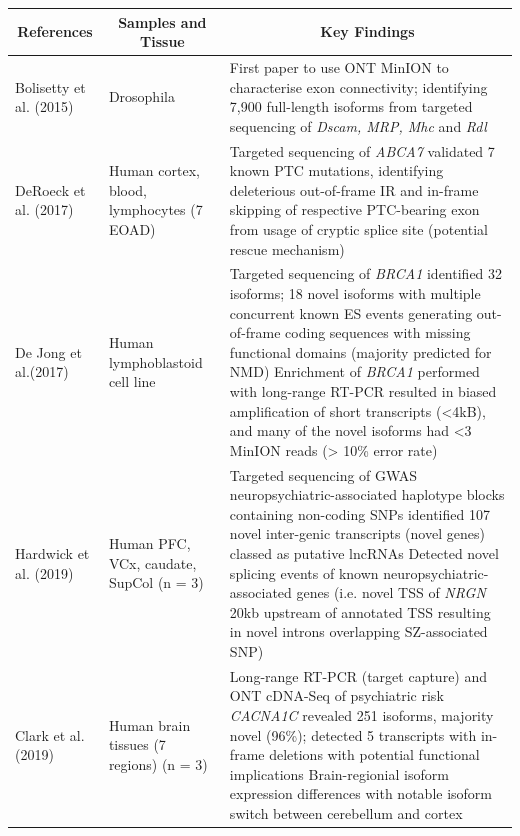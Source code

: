 \begin{changemargin}{1.5cm}
\begin{landscape}
\begin{longtable}[c]{p{4cm}p{4cm}p{18cm}}
			\toprule
			\multicolumn{1}{c}{References} &
			\multicolumn{1}{c}{Samples and Tissue} &
			\multicolumn{1}{c}{Key Findings} \\* \midrule
			\endfirsthead
			\endhead
			\bottomrule
			\endfoot
			\endlastfoot
			\centering Bolisetty et al. (2015)\cite{Bolisetty2015} &
			\centering Drosophila &
			\tabitem First paper to use ONT MinION to characterise exon connectivity; identifying 7,900 full-length isoforms from targeted sequencing of \textit{Dscam, MRP, Mhc} and \textit{Rdl}  \\
			\hdashline[0.5pt/5pt]
			
			\centering DeRoeck et al. (2017)\cite{DeRoeck2017}  &
			\centering Human cortex, blood, lymphocytes (7 EOAD) &
			\tabitem Targeted sequencing of \textit{ABCA7} validated 7 known PTC mutations, identifying deleterious out-of-frame IR and in-frame skipping of respective PTC-bearing exon from usage of cryptic splice site (potential rescue mechanism) \\
			\hdashline[0.5pt/5pt]
			
			\centering De Jong et al.(2017)\cite{DeJong2017}  &
			\centering Human lymphoblastoid cell line &
			\tabitem Targeted sequencing of \textit{BRCA1} identified 32 isoforms; 18 novel isoforms with multiple concurrent known ES events generating out-of-frame coding sequences with missing functional domains (majority predicted for NMD) \newline
			\tabitem Enrichment of \textit{BRCA1} performed with long-range RT-PCR resulted in biased amplification of short transcripts (<4kB), and many of the novel isoforms had <3 MinION reads (> 10\% error rate)  \\
			\hdashline[0.5pt/5pt]
			
			\centering Hardwick et al. (2019) \cite{Hardwick2019a} &
			\centering Human PFC, VCx, \newline caudate, SupCol (n = 3)  &
			\tabitem Targeted sequencing of GWAS neuropsychiatric-associated haplotype blocks containing non-coding SNPs identified 107 novel inter-genic transcripts (novel genes) classed as putative lncRNAs \newline 
			\tabitem Detected novel splicing events of known neuropsychiatric-associated genes (i.e. novel TSS of \textit{NRGN} 20kb upstream of annotated TSS resulting in novel introns overlapping SZ-associated SNP)  \\
			\hdashline[0.5pt/5pt]
			
			\centering Clark et al.(2019) \cite{Clark2019} &
			\centering Human brain tissues \newline (7 regions) (n = 3) &
			\tabitem Long-range RT-PCR (target capture) and ONT cDNA-Seq of psychiatric risk \textit{CACNA1C} revealed 251 isoforms, majority novel (96\%); detected 5 transcripts with in-frame deletions with potential functional implications  \newline 
			\tabitem Brain-regionial isoform expression differences with notable isoform switch between cerebellum and cortex  \\
			

\end{longtable}
\end{landscape}
\end{changemargin}

